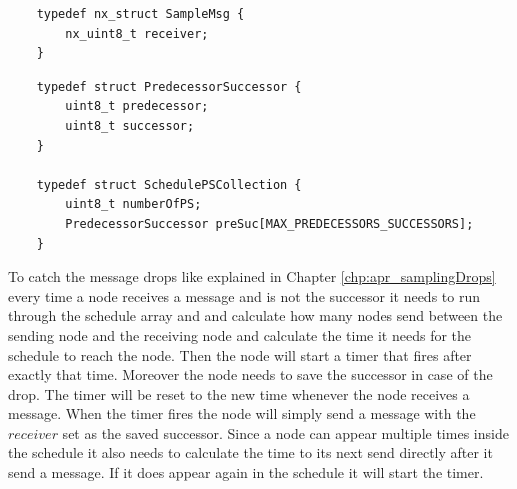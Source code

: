 \begin{lstlisting}
	typedef nx_struct SampleMsg {
		nx_uint8_t receiver;
	}
\end{lstlisting} 

\begin{lstlisting}
	typedef struct PredecessorSuccessor {
		uint8_t predecessor;
		uint8_t successor;
	}

	typedef struct SchedulePSCollection {
		uint8_t numberOfPS;
		PredecessorSuccessor preSuc[MAX_PREDECESSORS_SUCCESSORS]; 
	}
\end{lstlisting}

To catch the message drops like explained in Chapter \ref{chp:apr_samplingDrops} every time a node receives a message and is not the successor it needs to run through the schedule array and and calculate how many nodes send between the sending node and the receiving node and calculate the time it needs for the schedule to reach the node. Then the node will start a timer that fires after exactly that time. Moreover the node needs to save the successor in case of the drop. The timer will be reset to the new time whenever the node receives a message. When the timer fires the node will simply send a message with the $receiver$ set as the saved successor. Since a node can appear multiple times inside the schedule it also needs to calculate the time to its next send directly after it send a message. If it does appear again in the schedule it will start the timer.  